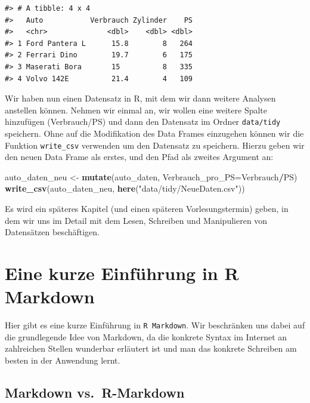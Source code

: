 \documentclass[]{book}
\newenvironment{Shaded}{\begin{snugshade}}{\end{snugshade}}
\newcommand{\KeywordTok}[1]{\textcolor[rgb]{0.13,0.29,0.53}{\textbf{#1}}}
\newcommand{\DataTypeTok}[1]{\textcolor[rgb]{0.13,0.29,0.53}{#1}}
\newcommand{\StringTok}[1]{\textcolor[rgb]{0.31,0.60,0.02}{#1}}
\newcommand{\OperatorTok}[1]{\textcolor[rgb]{0.81,0.36,0.00}{\textbf{#1}}}
\newcommand{\NormalTok}[1]{#1}
\begin{document}
\begin{verbatim}
#> # A tibble: 4 x 4
#>   Auto           Verbrauch Zylinder    PS
#>   <chr>              <dbl>    <dbl> <dbl>
#> 1 Ford Pantera L      15.8        8   264
#> 2 Ferrari Dino        19.7        6   175
#> 3 Maserati Bora       15          8   335
#> 4 Volvo 142E          21.4        4   109
\end{verbatim}

Wir haben nun einen Datensatz in R, mit dem wir dann weitere Analysen
anstellen können. Nehmen wir einmal an, wir wollen eine weitere Spalte
hinzufügen (Verbrauch/PS) und dann den Datensatz im Ordner
\texttt{data/tidy} speichern. Ohne auf die Modifikation des Data Frames
einzugehen können wir die Funktion \texttt{write\_csv} verwenden um den
Datensatz zu speichern. Hierzu geben wir den neuen Data Frame als
erstes, und den Pfad als zweites Argument an:

\begin{Shaded}
\begin{Highlighting}[]
\NormalTok{auto_daten_neu <-}\StringTok{ }\KeywordTok{mutate}\NormalTok{(auto_daten, }\DataTypeTok{Verbrauch_pro_PS=}\NormalTok{Verbrauch}\OperatorTok{/}\NormalTok{PS)}
\KeywordTok{write_csv}\NormalTok{(auto_daten_neu, }\KeywordTok{here}\NormalTok{(}\StringTok{"data/tidy/NeueDaten.csv"}\NormalTok{))}
\end{Highlighting}
\end{Shaded}

Es wird ein späteres Kapitel (und einen späteren Vorlesungstermin)
geben, in dem wir uns im Detail mit dem Lesen, Schreiben und
Manipulieren von Datensätzen beschäftigen.

\appendix


\chapter{Eine kurze Einführung in R Markdown}\label{markdown}

Hier gibt es eine kurze Einführung in \texttt{R\ Markdown}. Wir
beschränken uns dabei auf die grundlegende Idee von Markdown, da die
konkrete Syntax im Internet an zahlreichen Stellen wunderbar erläutert
ist und man das konkrete Schreiben am besten in der Anwendung lernt.

\section{Markdown vs.~R-Markdown}\label{markdown-vs.r-markdown}
\end{document}
